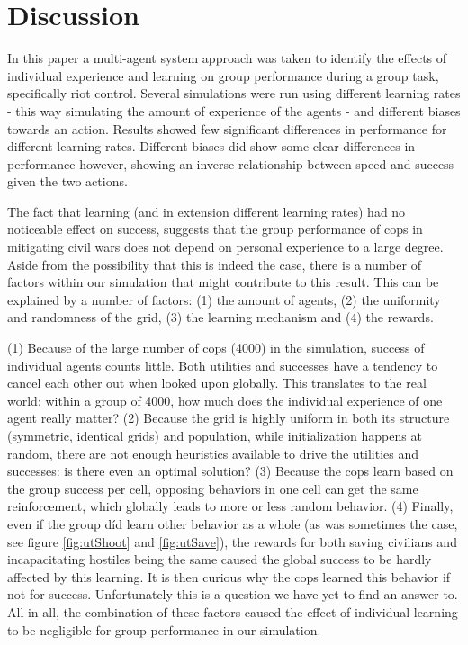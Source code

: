 \section{Discussion}
In this paper a multi-agent system approach was taken to identify the effects of individual experience and learning on group performance during a group task, specifically riot control. Several simulations were run using different learning rates - this way simulating the amount of experience of the agents - and different biases towards an action. Results showed few significant differences in performance for different learning rates. Different biases did show some clear differences in performance however, showing an inverse relationship between speed and success given the two actions.

The fact that learning (and in extension different learning rates) had no noticeable effect on success, suggests that the group performance of cops in mitigating civil wars does not depend on personal experience to a large degree. Aside from the possibility that this is indeed the case, there is a number of factors within our simulation that might contribute to this result.
This can be explained by a number of factors: (1) the amount of agents, (2) the uniformity and randomness of the grid, (3) the learning mechanism and (4) the rewards. 

(1) Because of the large number of cops (4000) in the simulation, success of individual agents counts little. Both utilities and successes have a tendency to cancel each other out when looked upon globally. This translates to the real world: within a group of 4000, how much does the individual experience of one agent really matter? 
(2) Because the grid is highly uniform in both its structure (symmetric, identical grids) and population, while initialization happens at random, there are not enough heuristics available to drive the utilities and successes: is there even an optimal solution? (3) Because the cops learn based on the group success per cell, opposing behaviors in one cell can get the same reinforcement, which globally leads to more or less random behavior. (4) Finally, even if the group d\'{i}d learn other behavior as a whole (as was sometimes the case, see figure \ref{fig:utShoot} and \ref{fig:utSave}), the rewards for both saving civilians and incapacitating hostiles being the same caused the global success to be hardly affected by this learning. It is then curious why the cops learned this behavior if not for success. Unfortunately this is a question we have yet to find an answer to.
All in all, the combination of these factors caused the effect of individual learning to be negligible for group performance in our simulation.

